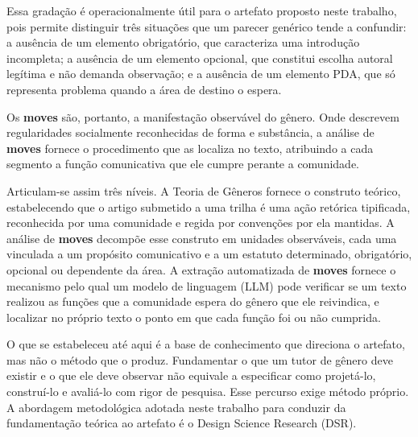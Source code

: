 Essa gradação é operacionalmente útil para o artefato proposto neste trabalho, pois permite distinguir três situações que um parecer genérico tende a confundir: a ausência de um elemento obrigatório, que caracteriza uma introdução incompleta; a ausência de um elemento opcional, que constitui escolha autoral legítima e não demanda observação; e a ausência de um elemento PDA, que só representa problema quando a área de destino o espera.

Os \textbf{moves} são, portanto, a manifestação observável do gênero. Onde \cite{GenresOrgComm} descrevem regularidades socialmente reconhecidas de forma e substância, a análise de \textbf{moves} fornece o procedimento que as localiza no texto, atribuindo a cada segmento a função comunicativa que ele cumpre
perante a comunidade. 


Articulam-se assim três níveis. A Teoria de Gêneros fornece o construto teórico, estabelecendo que o artigo submetido a uma trilha é uma ação retórica tipificada, reconhecida por uma comunidade e regida por convenções por ela mantidas. A análise de \textbf{moves} decompõe esse construto em unidades observáveis, cada uma vinculada a um propósito comunicativo e a um estatuto determinado, obrigatório, opcional ou dependente da área. A extração automatizada de \textbf{moves} fornece o mecanismo pelo qual um modelo de linguagem (LLM) pode verificar se um texto realizou as funções que a comunidade espera do gênero que ele reivindica, e localizar no próprio texto o ponto em que cada função foi ou não cumprida.

O que se estabeleceu até aqui é a base de conhecimento que direciona o artefato, mas não o método que o produz. Fundamentar o que um tutor de gênero deve existir e o que ele deve observar não equivale a especificar como projetá-lo, construí-lo e avaliá-lo com rigor de pesquisa. 
Esse percurso exige método próprio. A abordagem metodológica adotada neste trabalho para conduzir da fundamentação teórica ao artefato é o Design Science Research (DSR).


